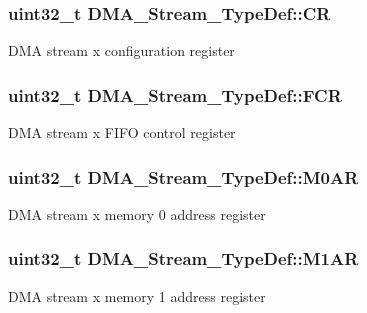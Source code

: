 \subsubsection[{\texorpdfstring{CR}{CR}}]{ uint32\+\_\+t D\+M\+A\+\_\+\+Stream\+\_\+\+Type\+Def\+::\+CR}\hypertarget{struct_d_m_a___stream___type_def_af893adc5e821b15d813237b2bfe4378b}{}\label{struct_d_m_a___stream___type_def_af893adc5e821b15d813237b2bfe4378b}
D\+MA stream x configuration register 
\subsubsection[{\texorpdfstring{F\+CR}{FCR}}]{ uint32\+\_\+t D\+M\+A\+\_\+\+Stream\+\_\+\+Type\+Def\+::\+F\+CR}\hypertarget{struct_d_m_a___stream___type_def_aad3d78ab35e7af48951be5be53392f9f}{}\label{struct_d_m_a___stream___type_def_aad3d78ab35e7af48951be5be53392f9f}
D\+MA stream x F\+I\+FO control register 
\subsubsection[{\texorpdfstring{M0\+AR}{M0AR}}]{ uint32\+\_\+t D\+M\+A\+\_\+\+Stream\+\_\+\+Type\+Def\+::\+M0\+AR}\hypertarget{struct_d_m_a___stream___type_def_a965da718db7d0303bff185d367d96fd6}{}\label{struct_d_m_a___stream___type_def_a965da718db7d0303bff185d367d96fd6}
D\+MA stream x memory 0 address register 
\subsubsection[{\texorpdfstring{M1\+AR}{M1AR}}]{ uint32\+\_\+t D\+M\+A\+\_\+\+Stream\+\_\+\+Type\+Def\+::\+M1\+AR}\hypertarget{struct_d_m_a___stream___type_def_a142ca5a1145ba9cf4cfa557655af1c13}{}\label{struct_d_m_a___stream___type_def_a142ca5a1145ba9cf4cfa557655af1c13}
D\+MA stream x memory 1 address register 
